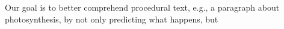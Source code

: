 Our goal is to better comprehend procedural text, e.g., a paragraph about photosynthesis, by not only predicting what happens, but
